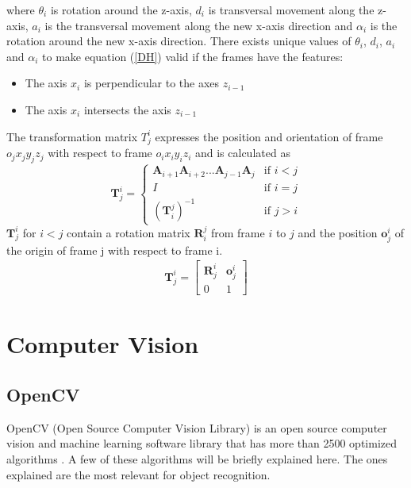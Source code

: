 where $\theta_i$ is rotation around the z-axis, $d_i$ is transversal movement along the z-axis, $a_i$ is the transversal movement along the new x-axis direction and $\alpha_i$ is the rotation around the new x-axis direction. There exists unique values of $\theta_i$, $d_i$, $a_i$ and $\alpha_i$ to make equation (\ref{DH}) valid if the frames have the features:
\begin{itemize}
\item The axis $x_i$ is perpendicular to the axes $z_{i-1}$
\item The axis $x_i$ intersects the axis $z_{i-1}$
\end{itemize}
The transformation matrix $T_j^i$ expresses the position and orientation of frame $o_jx_jy_jz_j$ with respect to frame $o_ix_iy_iz_i$ and is calculated as
\begin{equation}
  \boldsymbol{T}_j^i=\begin{cases}
    \boldsymbol{A}_{i+1}\boldsymbol{A}_{i+2}...\boldsymbol{A}_{j-1}\boldsymbol{A}_j & \text{if $i<j$}\\
    I & \text{if $i=j$}\\
    (\boldsymbol{T}_i^j)^{-1} & \text{if $j>i$}
  \end{cases}
\end{equation}
$\boldsymbol{T}_j^i$ for $i<j$ contain a rotation matrix $\boldsymbol{R}_i^j$ from frame $i$ to $j$ and the position $\boldsymbol{o}_j^i$ of the origin of frame j with respect to frame i.
\begin{eqnarray}
\boldsymbol{T}_j^i = \begin{bmatrix}
\boldsymbol{R}_j^i & \boldsymbol{o}_j^i\\
0 & 1
\end{bmatrix}
\label{T}
\end{eqnarray}  
\section{Computer Vision}
\subsection{OpenCV}\label{opencv}
OpenCV (Open Source Computer Vision Library) is an open source computer vision and machine learning software library that has more than 2500 optimized algorithms \citep{opencv}. A few of these algorithms will be briefly explained here. The ones explained are the most relevant for object recognition.
